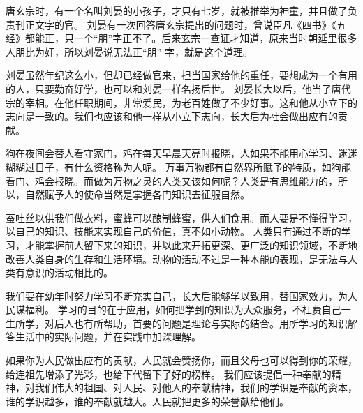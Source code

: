 \documentclass[avery5371,grid]{flashcards}
\begin{document}
{唐玄宗时，有一个名叫刘晏的小孩子，才只有七岁，就被推举为神童，并且做了负责刊正文字的官。} %
{刘晏有一次回答唐玄宗提出的问题时，曾说臣凡《四书》《五经》都能正，只一个“朋”字正不了。后来玄宗一查证才知道，原来当时朝延里很多人朋比为奸，所以刘晏说无法正“朋” 字，就是这个道理。} %

{刘晏虽然年纪这么小，但却已经做官来，担当国家给他的重任，要想成为一个有用的人，只要勤奋好学，也可以和刘晏一样名扬后世。} %
{刘晏长大以后，他当了唐代宗的宰相。在他任职期间，非常爱民，为老百姓做了不少好事。这和他从小立下的志向是一致的。我们也应该和他一样从小立下志向，长大后为社会做出应有的贡献。} %

{狗在夜间会替人看守家门，鸡在每天早晨天亮时报晓，人如果不能用心学习、迷迷糊糊过日子，有什么资格称为人呢。} %
{万事万物都有自然界所赋予的特质，如狗能看门、鸡会报晓。而做为万物之灵的人类又该如何呢？人类是有思维能力的，所以，自然赋予人的使命当然是掌握各门知识去征服自然。} %

{蚕吐丝以供我们做衣料，蜜蜂可以酿制蜂蜜，供人们食用。而人要是不懂得学习，以自己的知识、技能来实现自己的价值，真不如小动物。} %
{人类只有通过不断的学习，才能掌握前人留下来的知识，并以此来开拓更深、更广泛的知识领域，不断地改善人类自身的生存和生活环境。动物的活动不过是一种本能的表现，是无法与人类有意识的活动相比的。} %

{我们要在幼年时努力学习不断充实自己，长大后能够学以致用，替国家效力，为人民谋福利。} %
{学习的目的在于应用，如何把学到的知识为大众服务，不枉费自己一生所学，对后人也有所帮助，首要的问题是理论与实际的结合。用所学习的知识解答生活中的实际问题，并在实践中加深理解。} %

{如果你为人民做出应有的贡献，人民就会赞扬你，而且父母也可以得到你的荣耀，给连祖先增添了光彩，也给下代留下了好的榜样。} %
{我们应该提倡一种奉献的精神，对我们伟大的祖国、对人民、对他人的奉献精神，我们的学识是奉献的资本，谁的学识越多，谁的奉献就越大。人民就把更多的荣誉献给他们。} %
\end{document}
